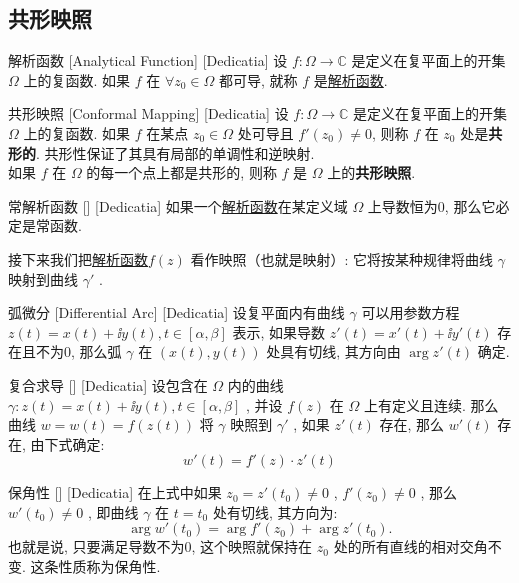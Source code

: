\documentclass[UTF8]{ctexart}
\newcommand{\AnalyticalFunction}{\hyperref[dfn:AnalyticalFunction]{解析函数}}
\begin{document}
\subsection{共形映照}
\begin{dfn}
    [UUID]
    {解析函数}
    [Analytical Function]
    [Dedicatia]
    设 \( f: \Omega \to \mathbb{C} \) 是定义在复平面上的开集 \( \Omega \) 上的复函数. 如果 \( f \) 在 \(\forall z_0 \in \Omega \) 都可导, 就称 \( f \) 是\AnalyticalFunction . 
\end{dfn}
\begin{dfn}
    [ConformalMapping]
    {共形映照}
    [Conformal Mapping]
    [Dedicatia]
    设 \( f: \Omega \to \mathbb{C} \) 是定义在复平面上的开集 \( \Omega \) 上的复函数. 如果 \( f \) 在某点 \( z_0 \in \Omega \) 处可导且 \( f'(z_0) \neq 0 \), 则称 \( f \) 在 \( z_0 \) 处是\textbf{共形的}. 共形性保证了其具有局部的单调性和逆映射. \\
    如果 \( f \) 在 \( \Omega \) 的每一个点上都是共形的, 则称 \( f \) 是 \( \Omega \) 上的\textbf{共形映照}. 
\end{dfn}
\begin{ppt}
    [TrivialAnalyticalFunction]
    {常解析函数}
    []
    [Dedicatia]
    如果一个\AnalyticalFunction 在某定义域 \( \Omega \) 上导数恒为0, 那么它必定是常函数. 
\end{ppt}
接下来我们把\AnalyticalFunction  \( f(z) \) 看作映照（也就是映射）: 它将按某种规律将曲线 \( \gamma \) 映射到曲线 \( \gamma' \) . 
\begin{dfn}
    [UUID]
    {弧微分}
    [Differential Arc]
    [Dedicatia]
    设复平面内有曲线 \( \gamma \) 可以用参数方程 \( z(t)=x(t)+\ii y(t), t\in[\alpha,\beta] \) 表示, 如果导数 \( z'(t)=x'(t)+\ii y'(t) \) 存在且不为0, 那么弧 \( \gamma \) 在 \( (x(t),y(t)) \) 处具有切线, 其方向由 \( \arg z'(t) \) 确定. 
\end{dfn}
\begin{thm}
    [UUID]
    {复合求导}
    []
    [Dedicatia]
    设包含在 \( \Omega \) 内的曲线 \( \gamma:z(t)=x(t)+\ii y(t), t\in[\alpha,\beta] \) , 并设 \( f(z) \) 在 \( \Omega \) 上有定义且连续. 那么曲线 \( w=w(t)=f(z(t)) \) 将 \( \gamma \) 映照到 \( \gamma' \) , 如果 \( z'(t) \) 存在, 那么 \( w'(t) \) 存在, 由下式确定: 
    \[w'(t)=f'(z)\cdot z'(t)\]
\end{thm}
\begin{thm}
    [UUID]
    {保角性}
    []
    [Dedicatia]
    在上式中如果 \( z_0=z'(t_0)\neq 0 \) ,  \( f'(z_0)\neq 0 \) , 那么 \( w'(t_0)\neq 0 \) , 即曲线 \( \gamma \) 在 \( t=t_0 \) 处有切线, 其方向为: 
    \[\arg w'(t_0)=\arg f'(z_0)+\arg z'(t_0).\]
    也就是说, 只要满足导数不为0, 这个映照就保持在 \( z_0 \) 处的所有直线的相对交角不变. 这条性质称为保角性. 
\end{thm}
\end{document}
